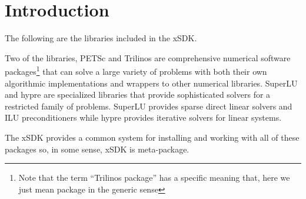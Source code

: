 \chapter*{Introduction}
The following are the libraries included in the xSDK.

Two of the libraries, PETSc and Trilinos are comprehensive numerical
software packages\footnote{Note that the term ``Trilinos package'' has
  a specific meaning that, here we just mean package in the generic
  sense} that can solve a large variety of problems with both their
own algorithmic implementations and wrappers to other numerical
libraries. SuperLU and hypre are specialized libraries that provide
sophisticated solvers for a restricted family of problems. SuperLU
provides sparse direct linear solvers and ILU preconditioners while
hypre provides iterative solvers for linear systems.

The xSDK provides a common system for installing and working with all of these
packages so, in some sense, xSDK is meta-package.










